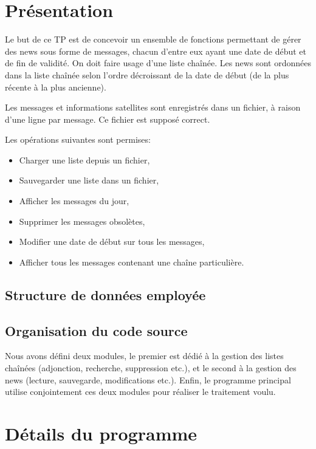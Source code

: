 \documentclass{report}
\begin{document}
  
  \setlength{\parskip}{10pt}
  \setlength{\parindent}{0pt}
  \chapter{Présentation}
    Le but de ce TP est de concevoir un ensemble de fonctions permettant de gérer des news sous forme de messages, chacun d'entre eux ayant une date de début et de fin de validité. On doit faire usage d'une liste chaînée. Les news sont ordonnées dans la liste chaînée selon l'ordre décroissant de la date de début (de la plus récente à la plus ancienne).

    Les messages et informations satellites sont enregistrés dans un fichier, à raison d'une ligne par message. Ce fichier est supposé correct.

    Les opérations suivantes sont permises:
    \begin{itemize}
      \item Charger une liste depuis un fichier,
      \item Sauvegarder une liste dans un fichier,
      \item Afficher les messages du jour,
      \item Supprimer les messages obsolètes,
      \item Modifier une date de début sur tous les messages,
      \item Afficher tous les messages contenant une chaîne particulière.
    \end{itemize}

    \section{Structure de données employée}
      
    \section{Organisation du code source}
      Nous avons défini deux modules, le premier est dédié à la gestion des listes chaînées (adjonction, recherche, suppression etc.), et le second à la gestion des news (lecture, sauvegarde, modifications etc.). Enfin, le programme principal utilise conjointement ces deux modules pour réaliser le traitement voulu.
      
  \chapter{Détails du programme}
    
\end{document}
